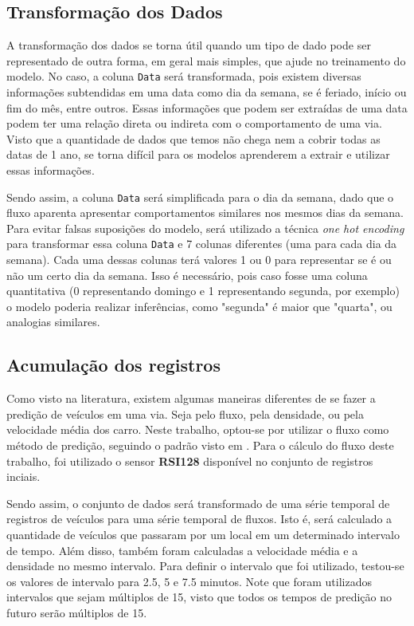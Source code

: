 \subsection{Transformação dos Dados}

A transformação dos dados se torna útil quando um tipo de dado pode ser representado de outra forma, em geral mais simples, que ajude no treinamento do modelo. No caso, a coluna \texttt{Data} será transformada, pois existem diversas informações subtendidas em uma data como dia da semana, se é feriado, início ou fim do mês, entre outros. Essas informações que podem ser extraídas de uma data podem ter uma relação direta ou indireta com o comportamento de uma via. Visto que a quantidade de dados que temos não chega nem a cobrir todas as datas de 1 ano, se torna difícil para os modelos aprenderem a extrair e utilizar essas informações. 

Sendo assim, a coluna \texttt{Data} será simplificada para o dia da semana, dado que o fluxo aparenta apresentar comportamentos similares nos mesmos dias da semana. Para evitar falsas suposições do modelo, será utilizado a técnica \textit{one hot encoding} para transformar essa coluna \texttt{Data} e 7 colunas diferentes (uma para cada dia da semana). Cada uma dessas colunas terá valores 1 ou 0 para representar se é ou não um certo dia da semana. Isso é necessário, pois caso fosse uma coluna quantitativa (0 representando domingo e 1 representando segunda, por exemplo) o modelo poderia realizar inferências, como "segunda" é maior que "quarta", ou analogias similares.

\subsection{Acumulação dos registros}

Como visto na literatura, existem algumas maneiras diferentes de se fazer a predição de veículos em uma via. Seja pelo fluxo, pela densidade, ou pela velocidade média dos carro. Neste trabalho, optou-se por utilizar o fluxo como método de predição, seguindo o padrão visto em \cite{lana_2018}. Para o cálculo do fluxo deste trabalho, foi utilizado o sensor \textbf{RSI128} disponível no conjunto de registros inciais.

Sendo assim, o conjunto de dados será transformado de uma série temporal de registros de veículos para uma série temporal de fluxos. Isto é, será calculado a quantidade de veículos que passaram por um local em um determinado intervalo de tempo. Além disso, também foram calculadas a velocidade média e a densidade no mesmo intervalo. Para definir o intervalo que foi utilizado, testou-se os valores de intervalo para 2.5, 5 e 7.5 minutos. Note que foram utilizados intervalos que sejam múltiplos de 15, visto que todos os tempos de predição no futuro serão múltiplos de 15.

